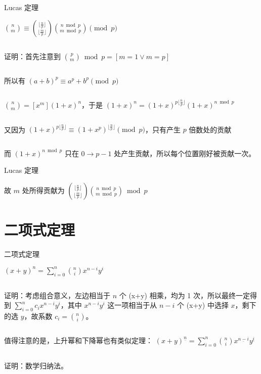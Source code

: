 \documentclass{beamer}
\begin{document}
\begin{frame}{Lucas 定理}

    $\binom nm\equiv\binom{\lfloor \frac np\rfloor}{\lfloor \frac mp\rfloor}\binom{n\bmod p}{m\bmod p}\pmod p$

    $ $
    \pause

    证明：首先注意到 $\binom pm \bmod p = [m=1\vee m=p]$

    $ $

    所以有 $(a+b)^p\equiv a^p+b^p\pmod p$

    $ $
    \pause

    $\binom nm =[x^m](1+x)^n$，于是 $(1+x)^n = (1+x)^{p\lfloor\frac np\rfloor}(1+x)^{n\bmod p}$

    $ $
    \pause

    又因为 $(1+x)^{p\lfloor\frac np\rfloor}\equiv(1+x^p)^{\lfloor\frac np\rfloor}\pmod p$，只有产生 $p$ 倍数处的贡献

    $ $
    \pause

    而 $(1+x)^{n\bmod p}$ 只在 $0\rightarrow p-1$ 处产生贡献，所以每个位置刚好被贡献一次。
     
\end{frame}

\begin{frame}{Lucas 定理}

    故 $m$ 处所得贡献为 $\binom{\lfloor \frac np\rfloor}{\lfloor \frac mp\rfloor}\binom{n\bmod p}{m\bmod p}\bmod p$
\end{frame}

\section{二项式定理}

\begin{frame}{二项式定理}

    $(x+y)^n = \sum\limits_{i=0}^n{\binom ni x^{n-i}y^i}$

    $ $
    \pause

    证明：考虑组合意义，左边相当于 $n$ 个 (x+y) 相乘，均为 1 次，所以最终一定得到 $\sum\limits_{i=0}^n{c_i x^{n-i}y^i}$，其中 $x^{n-i}y^i$ 这一项相当于从 $n-i$ 个 (x+y) 中选择 $x$，剩下的选 $y$，故系数 $c_i=\binom ni$。

    $ $
    \pause

    值得注意的是，上升幂和下降幂也有类似定理： $(x+y)^{\underline n} = \sum\limits_{i=0}^n{\binom ni x^{\underline {n-i}}y^{\underline i}}$

    $ $
    \pause

    证明：数学归纳法。
    
\end{frame}
\end{document}
